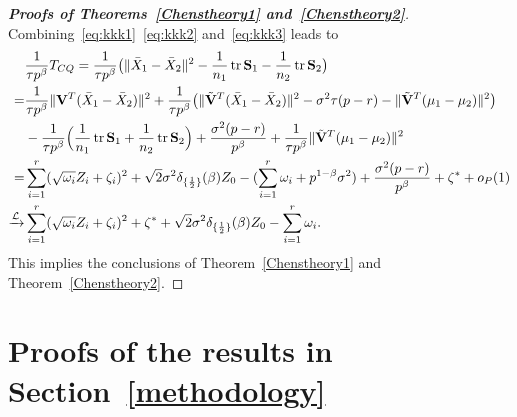 \documentclass[review]{elsarticle}
\DeclareMathOperator{\mytr}{tr}
\theoremstyle{plain}
\theoremstyle{definition}
\theoremstyle{remark}
\begin{document}
\begin{appendices}
\begin{proof}[\textbf{Proofs of Theorems~\ref{Chenstheory1} and~\ref{Chenstheory2}}]
    Combining~\eqref{eq:kkk1}~\eqref{eq:kkk2} and~\eqref{eq:kkk3} leads to
    $$
    \begin{aligned}
        &\frac{1}{\tau p^{\beta}} T_{CQ}
        =\frac{1}{\tau p^{\beta}}\big(\|\bar{X}_1-\bar{X}_2\|^2-\frac{1}{n_1}\mytr \BS_1-\frac{1}{n_2}\mytr \BS_2\big)\\
        =&
        \frac{1}{\tau p^{\beta}}{\|\BV^T(\bar{X}_1-\bar{X}_2)\|^2}+
        \frac{1}{\tau p^{\beta}} \big({\|\tilde{\BV}^T(\bar{X}_1-\bar{X}_2)\|^2-\sigma^2 \tau(p-r)-\|\tilde{\BV}^T(\mu_1-\mu_2)\|^2}\big)\\
        &-\frac{1}{\tau p^{\beta}}\Big(\frac{1}{n_1}\mytr \BS_1+\frac{1}{n_2}\mytr \BS_2\Big)+\frac{\sigma^2 (p-r)}{p^\beta}+\frac{1}{\tau p^\beta}\|\tilde{\BV}^T(\mu_1-\mu_2)\|^2\\
        =&
        \sum_{i=1}^r (\sqrt{\omega_i} Z_i+\zeta_i)^2+
   \sqrt{2} \sigma^2 \delta_{\{\frac{1}{2}\}}(\beta)Z_0
        -
        (\sum_{i=1}^r \omega_i+p^{1-\beta}\sigma^2)
        +\frac{\sigma^2 (p-r)}{p^\beta}+\zeta^*+o_P(1)\\
        \xrightarrow{\mathcal{L}}&
        \sum_{i=1}^r (\sqrt{\omega_i} Z_i+\zeta_i)^2+
\zeta^*+
    \sqrt{2}\sigma^2 \delta_{\{\frac{1}{2}\}}(\beta)Z_0
        -
        \sum_{i=1}^r \omega_i.
    \end{aligned}
    $$
    This implies the conclusions of Theorem~\ref{Chenstheory1} and Theorem~\ref{Chenstheory2}.

%

\end{proof}

\section{Proofs of the results in Section~\ref{methodology}}\label{appendixB}


\end{appendices}
\end{document}
